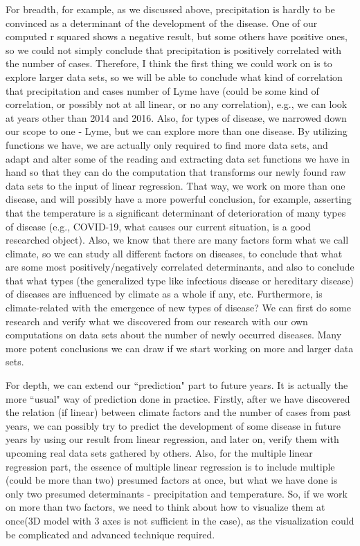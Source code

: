 \documentclass[fontsize=11pt]{article}
\begin{document}
\begin{itemize}
For breadth, for example, as we discussed above, precipitation is hardly to be convinced as a determinant of the development of the disease. One of our computed r squared shows a negative result, but some others have positive ones, so we could not simply conclude that precipitation is positively correlated with the number of cases. Therefore, I think the first thing we could work on is to explore larger data sets, so we will be able to conclude what kind of correlation that precipitation and cases number of Lyme have (could be some kind of correlation, or possibly not at all linear, or no any correlation), e.g., we can look at years other than 2014 and 2016. Also, for types of disease, we narrowed down our scope to one - Lyme, but we can explore more than one disease. By utilizing functions we have, we are actually only required to find more data sets, and adapt and alter some of the reading and extracting data set functions we have in hand so that they can do the computation that transforms our newly found raw data sets to the input of linear regression. That way, we work on more than one disease, and will possibly have a more powerful conclusion, for example, asserting that the temperature is a significant determinant of deterioration of many types of disease (e.g., COVID-19, what causes our current situation, is a good researched object). Also, we know that there are many factors form what we call climate, so we can study all different factors on diseases, to conclude that what are some most positively/negatively correlated determinants, and also to conclude that what types (the generalized type like infectious disease or hereditary disease) of diseases are influenced by climate as a whole if any, etc. Furthermore, is climate-related with the emergence of new types of disease? We can first do some research and verify what we discovered from our research with our own computations on data sets about the number of newly occurred diseases. Many more potent conclusions we can draw if we start working on more and larger data sets.

For depth, we can extend our ``prediction" part to future years. It is actually the more ``usual" way of prediction done in practice. Firstly, after we have discovered the relation (if linear) between climate factors and the number of cases from past years, we can possibly try to predict the development of some disease in future years by using our result from linear regression, and later on, verify them with upcoming real data sets gathered by others. Also, for the multiple linear regression part, the essence of multiple linear regression is to include multiple (could be more than two) presumed factors at once, but what we have done is only two presumed determinants - precipitation and temperature. So, if we work on more than two factors, we need to think about how to visualize them at once(3D model with 3 axes is not sufficient in the case), as the visualization could be complicated and advanced technique required. 


\end{itemize}
\end{document}
